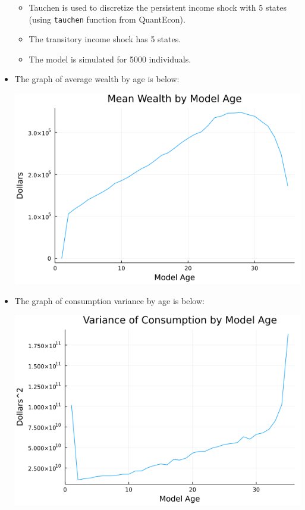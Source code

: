 \documentclass{article}
\begin{document}
\begin{itemize}
\begin{itemize}
\item Tauchen is used to discretize the persistent income shock with 5 states (using \texttt{tauchen} function from QuantEcon).

\item The transitory income shock has 5 states.

\item The model is simulated for 5000 individuals.

\end{itemize}

\item The graph of average wealth by age is below:

\includegraphics[scale=.5]{mean_wealth}

\pagebreak

\item The graph of consumption variance by age is below:

\includegraphics[scale=.5]{var_consumption}


\end{itemize}
\end{document}

